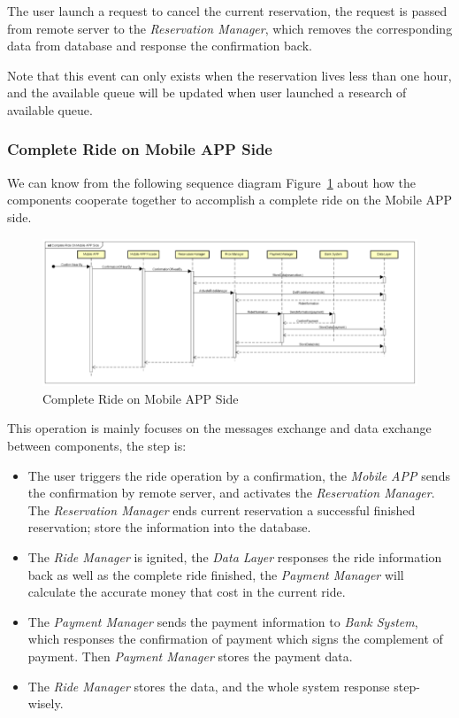 \documentclass[a4paper,11pt]{article}
\begin{document}
The user launch a request to cancel the current reservation, the request is passed from remote server to the \textsl{Reservation Manager}, which removes the corresponding data from database and response the confirmation back. 

Note that this event can only exists when the reservation lives less than one hour, and the available queue will be updated when user launched a research of available queue.
		
		\subsubsection{Complete Ride on Mobile APP Side}
We can know from the following sequence diagram Figure~\ref{fig-completemob} about how the components cooperate together to accomplish a complete ride on the Mobile APP side.

		\begin{figure}[H]
   			\centering
   			\includegraphics[width=\textwidth]{images/complete_ride_on_mobile_app_side_SD}
  	    		\caption{Complete Ride on Mobile APP Side}\label{fig-completemob}
		\end{figure}
		
This operation is mainly focuses on the messages exchange and data exchange between components, the step is:
			\begin{itemize}
				\item The user triggers the ride operation by a confirmation, the \textsl{Mobile APP} sends the confirmation by remote server, and activates the \textsl{Reservation Manager}. The \textsl{Reservation Manager} ends current reservation a successful finished reservation; store the information into the database. 
				\item The \textsl{Ride Manager} is ignited, the \textsl{Data Layer} responses the ride information back as well as the complete ride finished, the \textsl{Payment Manager} will calculate the accurate money that cost in the current ride.
				\item The \textsl{Payment Manager} sends the payment information to \textsl{Bank System}, which responses the confirmation of payment which signs the complement of payment. Then \textsl{Payment Manager} stores the payment data.
				\item The \textsl{Ride Manager} stores the data, and the whole system response step-wisely.
			\end{itemize}	
			
\end{document}
